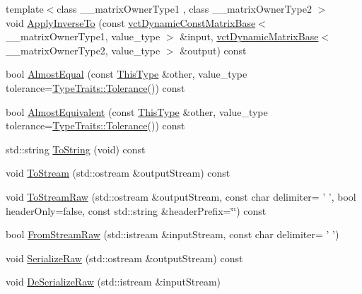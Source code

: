 \begin{DoxyCompactItemize}
\item 
{\footnotesize template$<$class \-\_\-\-\_\-matrix\-Owner\-Type1 , class \-\_\-\-\_\-matrix\-Owner\-Type2 $>$ }\\void \hyperlink{classvct_frame_base_ad86ca94ce86c6e1d25feac5786c1a9c3}{Apply\-Inverse\-To} (const \hyperlink{classvct_dynamic_const_matrix_base}{vct\-Dynamic\-Const\-Matrix\-Base}$<$ \-\_\-\-\_\-matrix\-Owner\-Type1, value\-\_\-type $>$ \&input, \hyperlink{classvct_dynamic_matrix_base}{vct\-Dynamic\-Matrix\-Base}$<$ \-\_\-\-\_\-matrix\-Owner\-Type2, value\-\_\-type $>$ \&output) const 
\item 
bool \hyperlink{classvct_frame_base_af4b4436216fecfaa8f9eba4f57f60d91}{Almost\-Equal} (const \hyperlink{classvct_frame_base_a076f1fe4fc957faa0d1ff7450d1cb768}{This\-Type} \&other, value\-\_\-type tolerance=\hyperlink{classcmn_type_traits_adc129bf9867295b90d300768b780fa99}{Type\-Traits\-::\-Tolerance}()) const 
\item 
bool \hyperlink{classvct_frame_base_a7e7820a32c408471a3d773005a4ed1ab}{Almost\-Equivalent} (const \hyperlink{classvct_frame_base_a076f1fe4fc957faa0d1ff7450d1cb768}{This\-Type} \&other, value\-\_\-type tolerance=\hyperlink{classcmn_type_traits_adc129bf9867295b90d300768b780fa99}{Type\-Traits\-::\-Tolerance}()) const 
\item 
std\-::string \hyperlink{classvct_frame_base_a19b8c4c53cf3c2f2f21fdff389bf17ee}{To\-String} (void) const 
\item 
void \hyperlink{classvct_frame_base_a1cf756ad3b4298e57742abe29b042ae1}{To\-Stream} (std\-::ostream \&output\-Stream) const 
\item 
void \hyperlink{classvct_frame_base_a1c200125979ce9aa7328950177fdd38e}{To\-Stream\-Raw} (std\-::ostream \&output\-Stream, const char delimiter= ' ', bool header\-Only=false, const std\-::string \&header\-Prefix=\char`\"{}\char`\"{}) const 
\item 
bool \hyperlink{classvct_frame_base_ab1611f1a1f24865301ed44c1f2ec315b}{From\-Stream\-Raw} (std\-::istream \&input\-Stream, const char delimiter= ' ')
\item 
void \hyperlink{classvct_frame_base_a52850a6beccb4d50e6d63cc2e222910a}{Serialize\-Raw} (std\-::ostream \&output\-Stream) const 
\item 
void \hyperlink{classvct_frame_base_af9dd60e9c4058e335b480e39cf8c899b}{De\-Serialize\-Raw} (std\-::istream \&input\-Stream)
\end{DoxyCompactItemize}
{\bf }\par

